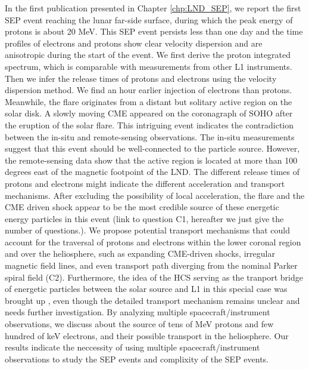 In the first publication presented in Chapter \ref{chp:LND_SEP}, we report the first \ac{SEP} event reaching the lunar far-side surface, during which the peak energy of protons is about 20 MeV. This \ac{SEP} event persists less than one day and the time profiles of electrons and protons show clear velocity dispersion and are anisotropic during the start of the event.
We first derive the proton integrated spectrum, which is comparable with measurements from other \acs{L1} instruments. Then we infer the release times of protons and electrons using the velocity dispersion method. We find an hour earlier injection of electrons than protons. Meanwhile, the flare originates from a distant but solitary active region on the solar disk. A slowly moving \ac{CME} appeared on the coronagraph of \acs{SOHO} after the eruption of the solar flare.
This intriguing event indicates the contradiction between the in-situ and remote-sensing observations. The in-situ measurements suggest that this event should be well-connected to the particle source. However, the remote-sensing data show that the active region is located at more than 100 degrees east of the magnetic footpoint of the \ac{LND}. The different release times of protons and electrons might indicate the different acceleration and transport mechanisms.
After excluding the possibility of local acceleration, the flare and the \ac{CME} driven shock appear to be the most credible source of these energetic energy particles in this event (link to question C1, hereafter we just give the number of questions.). We propose potential transport mechanisms that could account for the traversal of protons and electrons within the lower coronal region and over the heliosphere, such as expanding \ac{CME}-driven shocks, irregular magnetic field lines, and even transport path diverging from the nominal Parker spiral field (C2). Furthermore, the idea of the \ac{HCS} serving as the tranport bridge of energetic particles between the solar source and \acs{L1} in this special case was brought up \citep{Battarbee2018ApJ}, even though the detailed transport mechanism remains unclear and needs further investigation. 
By analyzing multiple spacecraft/instrument observations, we discuss about the source of tens of MeV protons and few hundred of keV electrons, and their possible transport in the heliosphere. Our results indicate the neccessity of using multiple spacecraft/instrument observations to study the \ac{SEP} events and complixity of the \ac{SEP} events.

